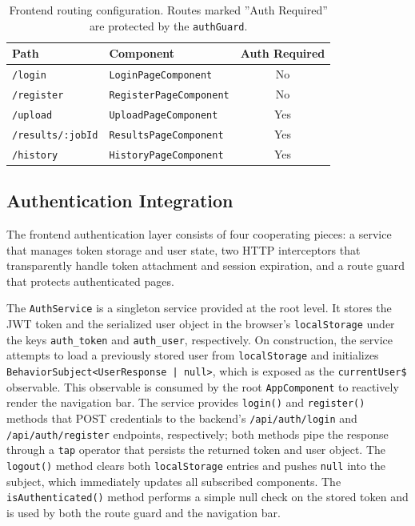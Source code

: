 \begin{table}[htbp]
    \centering
    \footnotesize
    \begin{tabular}{|l|l|c|}
        \hline
        \textbf{Path}            & \textbf{Component}             & \textbf{Auth Required} \\
        \hline\hline
        \texttt{/login}          & \texttt{LoginPageComponent}    & No                     \\
        \hline
        \texttt{/register}       & \texttt{RegisterPageComponent} & No                     \\
        \hline
        \texttt{/upload}         & \texttt{UploadPageComponent}   & Yes                    \\
        \hline
        \texttt{/results/:jobId} & \texttt{ResultsPageComponent}  & Yes                    \\
        \hline
        \texttt{/history}        & \texttt{HistoryPageComponent}  & Yes                    \\
        \hline
    \end{tabular}
    \caption{Frontend routing configuration. Routes marked ''Auth Required'' are protected by the \texttt{authGuard}.}
    \label{tab:frontend-routes}
\end{table}

\subsection{Authentication Integration}
\label{subsec:frontend-auth}

 \par The frontend authentication layer consists of four cooperating pieces: a service that manages token storage and user state, two HTTP interceptors that transparently handle token attachment and session expiration, and a route guard that protects authenticated pages.

The \texttt{AuthService} is a singleton service provided at the root level. It stores the JWT token and the serialized user object in the browser's \texttt{localStorage} under the keys \texttt{auth\_token} and \texttt{auth\_user}, respectively. On construction, the service attempts to load a previously stored user from \texttt{localStorage} and initializes \texttt{BehaviorSubject<UserResponse | null>}, which is exposed as the \texttt{cur\-rentUser\$} observable. This observable is consumed by the root \texttt{AppComponent} to reactively render the navigation bar. The service provides \texttt{login()} and \texttt{re\-gis\-ter()} methods that POST credentials to the backend's \texttt{/api/auth/login} and \texttt{/api/\-auth/\-re\-gis\-ter} endpoints, respectively; both methods pipe the response through a \texttt{tap} operator that persists the returned token and user object. The \texttt{logout()} method clears both \texttt{localStorage} entries and pushes \texttt{null} into the subject, which immediately updates all subscribed components. The \texttt{is\-Au\-then\-ti\-cated()} method performs a simple null check on the stored token and is used by both the route guard and the navigation bar.

